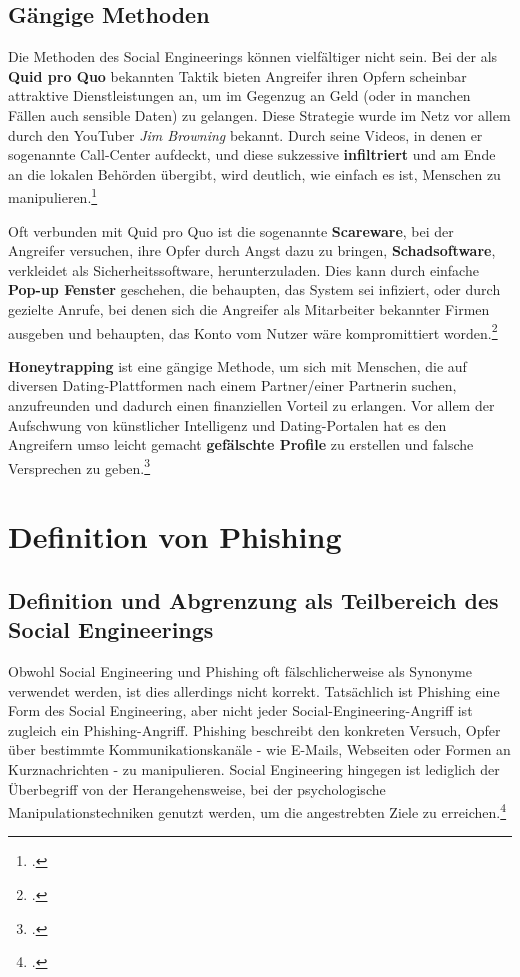 \documentclass[12pt, a4paper, oneside]{scrartcl}
\begin{document}
\subsection{Gängige Methoden}
\par
Die Methoden des Social Engineerings können vielfältiger nicht sein.
Bei der als \textbf{Quid pro Quo} bekannten Taktik bieten Angreifer ihren Opfern scheinbar attraktive Dienstleistungen an, um im Gegenzug
an Geld (oder in manchen Fällen auch sensible Daten) zu gelangen. Diese Strategie wurde im Netz vor allem durch den YouTuber \textit{Jim Browning} bekannt.
Durch seine Videos, in denen er sogenannte Call-Center aufdeckt, und diese sukzessive \textbf{infiltriert} und
am Ende an die lokalen Behörden übergibt, wird deutlich, wie einfach es ist, Menschen zu manipulieren.\footcite{JB_YouTube}
\par
Oft verbunden mit Quid pro Quo ist die sogenannte \textbf{Scareware}, bei der Angreifer versuchen, ihre Opfer 
durch Angst dazu zu bringen, \textbf{Schadsoftware}, verkleidet als Sicherheitssoftware, herunterzuladen. Dies kann 
durch einfache \textbf{Pop-up Fenster} geschehen, die behaupten, das System sei infiziert, oder durch gezielte
Anrufe, bei denen sich die Angreifer als Mitarbeiter bekannter Firmen ausgeben und behaupten, das Konto
vom Nutzer wäre kompromittiert worden.\footcite{Keeper_Scareware}
\par
\textbf{Honeytrapping} ist eine gängige Methode, um sich mit Menschen, die auf diversen Dating-Plattformen nach
einem Partner/einer Partnerin suchen, anzufreunden und dadurch einen finanziellen Vorteil zu erlangen. Vor allem 
der Aufschwung von künstlicher Intelligenz und Dating-Portalen hat es den Angreifern umso leicht gemacht
\textbf{gefälschte Profile} zu erstellen und falsche Versprechen zu geben.\footcite{CS_10Arten}\\

\section{Definition von Phishing}

\subsection{Definition und Abgrenzung als Teilbereich des Social Engineerings}
Obwohl Social Engineering und Phishing oft fälschlicherweise als Synonyme verwendet werden, ist dies allerdings nicht korrekt.
Tatsächlich ist Phishing eine Form des Social Engineering, aber nicht jeder Social-Engineering-Angriff ist zugleich
ein Phishing-Angriff. 
Phishing beschreibt den konkreten Versuch, Opfer über bestimmte Kommunikationskanäle - wie E-Mails, Webseiten oder 
Formen an Kurznachrichten - zu manipulieren.
Social Engineering hingegen ist lediglich der Überbegriff von der Herangehensweise, bei der psychologische
Manipulationstechniken genutzt werden, um die angestrebten Ziele zu erreichen.\footcite{Keeper_Phishing}
\end{document}
